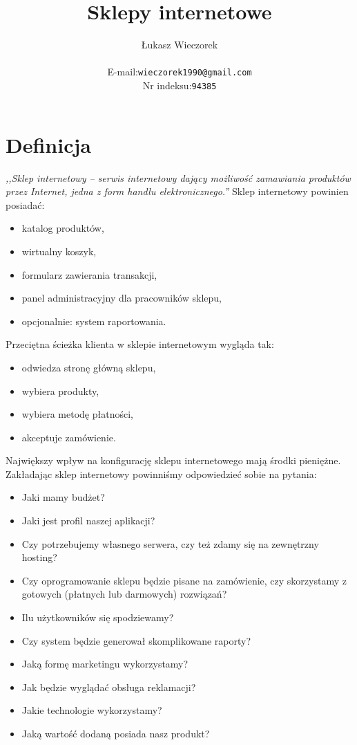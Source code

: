 \documentclass{article}
\title{
	Sklepy internetowe
}
\author{
	Łukasz Wieczorek\\
	\begin{tabular}{rl}
	E-mail: & \texttt{wieczorek1990@gmail.com}\\
	Nr indeksu: & \texttt{94385}\\
	\end{tabular}
}
\begin{document}
\maketitle
\section{Definicja}
\emph{,,Sklep internetowy -- serwis internetowy dający możliwość zamawiania produktów przez Internet, jedna z form handlu elektronicznego.''}\cite{wiki:sklep}
Sklep internetowy powinien posiadać:
\begin{itemize}
\item katalog produktów,
\item wirtualny koszyk,
\item formularz zawierania transakcji,
\item panel administracyjny dla pracowników sklepu,
\item opcjonalnie: system raportowania.
\end{itemize}
Przeciętna ścieżka klienta w sklepie internetowym wygląda tak:
\begin{itemize}
\item odwiedza stronę główną sklepu,
\item wybiera produkty,
\item wybiera metodę płatności,
\item akceptuje zamówienie.
\end{itemize}
Największy wpływ na konfigurację sklepu internetowego mają środki pieniężne. Zakładając sklep internetowy powinniśmy odpowiedzieć sobie na pytania:
\begin{itemize}
\item Jaki mamy budżet?
\item Jaki jest profil naszej aplikacji?
\item Czy potrzebujemy własnego serwera, czy też zdamy się na zewnętrzny hosting?
\item Czy oprogramowanie sklepu będzie pisane na zamówienie, czy skorzystamy z gotowych (płatnych lub darmowych) rozwiązań?
\item Ilu użytkowników się spodziewamy?
\item Czy system będzie generował skomplikowane raporty?
\item Jaką formę marketingu wykorzystamy?
\item Jak będzie wyglądać obsługa reklamacji?
\item Jakie technologie wykorzystamy?
\item Jaką wartość dodaną posiada nasz produkt?
\end{itemize}
\end{document}
